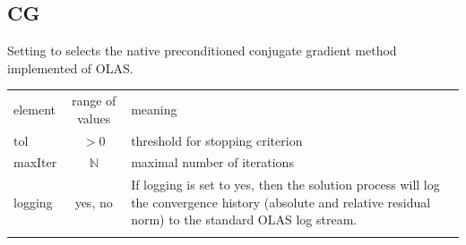 \subsection{CG}
Setting  to  selects the native preconditioned conjugate
gradient method implemented of OLAS.
%
%
\begin{center}
\begin{tabular}{lcp{}}
\hline\noalign{\smallskip}
element & range of values & meaning \\
\noalign{\smallskip}\hline\noalign{\smallskip}
tol     & $> 0$        & threshold for stopping criterion\\
\noalign{\smallskip}\hline\noalign{\smallskip}
maxIter & $\mathbb{N}$ & maximal number of iterations\\
\noalign{\smallskip}\hline\noalign{\smallskip}
logging & yes, no & If logging is set to yes, then the solution process will
	            log the convergence history (absolute and relative residual
                    norm) to the standard OLAS log stream.\\
\noalign{\smallskip}\hline
\end{tabular}
\end{center}
%
%
